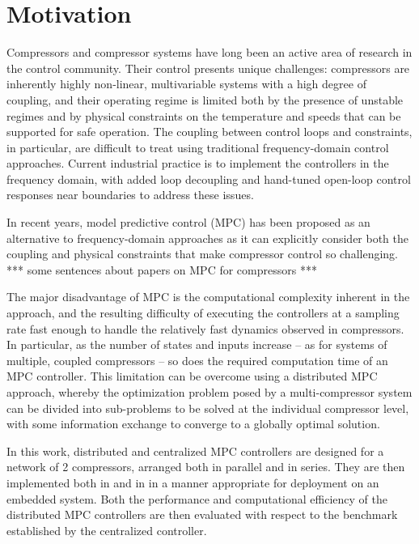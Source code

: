 \section{Motivation}
\label{sec:intro:motivation}

Compressors and compressor systems have long been an active area of research in the control community.
Their control presents unique challenges: compressors are inherently highly non-linear, multivariable systems with a high degree of coupling, and their operating regime is limited both by the presence of unstable regimes and by physical constraints on the temperature and speeds that can be supported for safe operation.
The coupling between control loops and constraints, in particular, are difficult to treat using traditional frequency-domain control approaches.
Current industrial practice is to implement the controllers in the frequency domain, with added loop decoupling and hand-tuned open-loop control responses near boundaries to address these issues.

In recent years, model predictive control (MPC) has been proposed as an alternative to frequency-domain approaches as it can explicitly consider both the coupling and physical constraints that make compressor control so challenging.
*** some sentences about papers on MPC for compressors ***

The major disadvantage of MPC is the computational complexity inherent in the approach, and the resulting difficulty of executing the controllers at a sampling rate fast enough to handle the relatively fast dynamics observed in compressors. 
In particular, as the number of states and inputs increase -- as for systems of multiple, coupled compressors -- so does the required computation time of an MPC controller.
This limitation can be overcome using a distributed MPC approach, whereby the optimization problem posed by a multi-compressor system can be divided into sub-problems to be solved at the individual compressor level, with some information exchange to converge to a globally optimal solution. 

In this work, distributed and centralized MPC controllers are designed for a network of 2 compressors, arranged both in parallel and in series. 
They are then implemented both in \slink{} and in \cpp{} in a manner appropriate for deployment on an embedded system.
Both the performance and computational efficiency of the distributed MPC controllers are then evaluated with respect to the benchmark established by the centralized controller.


